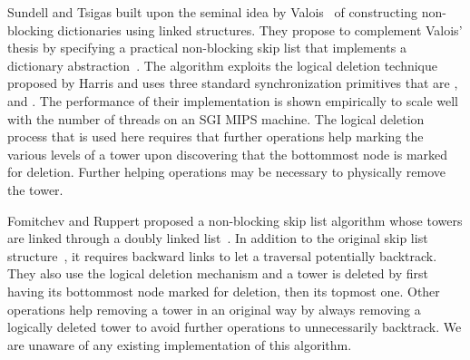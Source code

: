 
Sundell and Tsigas built upon the seminal idea by Valois~\cite{Val96} of constructing 
non-blocking dictionaries using linked structures. They propose to complement Valois' thesis by 
specifying a practical non-blocking skip list that implements a dictionary 
abstraction~\cite{ST04}. The algorithm exploits the logical deletion technique proposed by Harris 
and uses three standard synchronization primitives that are
,  and \CAS{}.
The performance of their implementation is shown 
empirically to scale well with the number of threads on an SGI MIPS machine.
The logical deletion process that is used here requires that further operations 
help marking the various levels of a tower upon discovering that the bottommost node is marked 
for deletion. Further helping operations may be necessary to physically remove the tower.

Fomitchev and Ruppert proposed a non-blocking skip list algorithm whose towers are linked 
through a doubly linked list~\cite{FR04}. In addition to the original skip list structure~\cite{Pug90}, 
it requires backward links to let a traversal potentially backtrack. They also use the logical deletion 
mechanism and a tower is deleted by first having its bottommost node marked for deletion, 
then its topmost one. Other operations help removing a tower in an original way by always removing 
a logically deleted tower to avoid further operations to unnecessarily backtrack.
We are unaware of any existing implementation of this algorithm.

